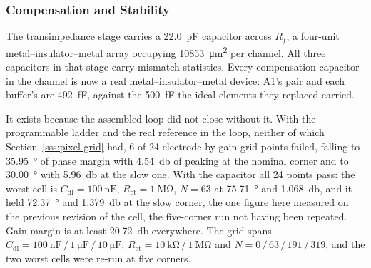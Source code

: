 
\subsubsection{Compensation and Stability}\label{sss:pixtop-stability}

The transimpedance stage carries a \SI{22.0}{\pico\farad} capacitor across
\(R_f\), a four-unit metal--insulator--metal array occupying
\SI{10853}{\micro\meter\squared} per channel. All three capacitors in that
stage carry mismatch statistics. Every compensation capacitor in the channel is
now a real metal--insulator--metal device: A1's pair and each buffer's are
\SI{492}{\femto\farad}, against the \SI{500}{\femto\farad} the ideal elements
they replaced carried.

It exists because the assembled loop did not close without it. With the
programmable ladder and the real reference in the loop, neither of which
Section~\ref{sss:pixel-grid} had, 6 of 24 electrode-by-gain grid points
failed, falling to \SI{35.95}{\degree} of phase margin with \SI{4.54}{\decibel}
of peaking at the nominal corner and to \SI{30.00}{\degree} with
\SI{5.96}{\decibel} at the slow one. With the capacitor all 24 points pass:
the worst cell is \(C_{\mathrm{dl}} = \SI{100}{\nano\farad}\),
\(R_{\mathrm{ct}} = \SI{1}{\mega\ohm}\), \(N = 63\) at \SI{75.71}{\degree} and
\SI{1.068}{\decibel}, and it held \SI{72.37}{\degree} and
\SI{1.379}{\decibel} at the slow corner, the one figure here measured on the
previous revision of the cell, the five-corner run not having been repeated.
Gain margin is at least \SI{20.72}{\decibel} everywhere. The grid spans
\(C_{\mathrm{dl}} = \SI{100}{\nano\farad}\,/\,\SI{1}{\micro\farad}\,/\,\SI{10}{\micro\farad}\),
\(R_{\mathrm{ct}} = \SI{10}{\kilo\ohm}\,/\,\SI{1}{\mega\ohm}\) and
\(N = 0\,/\,63\,/\,191\,/\,319\), and the two worst cells were re-run at five
corners.

